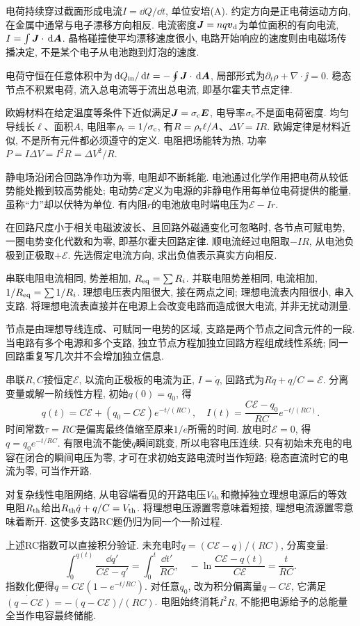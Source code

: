 \label{ch:dc}
电荷持续穿过截面形成电流$I=\dd Q/\dd t$, 单位安培(A). 约定方向是正电荷运动方向, 在金属中通常与电子漂移方向相反. 电流密度$\boldsymbol{J}=nq\boldsymbol{v}_{\rm d}$为单位面积的有向电流, $I=\int\boldsymbol{J}\cdot\,\mathrm d\boldsymbol{A}$. 晶格碰撞使平均漂移速度很小, 电路开始响应的速度则由电磁场传播决定, 不是某个电子从电池跑到灯泡的速度.

电荷守恒在任意体积中为$\,\mathrm d Q_{\rm in}/\,\mathrm d t=-\oint\boldsymbol{J}\cdot\,\mathrm d\boldsymbol{A}$, 局部形式为$\partial_t\rho+\nabla\cdot\jj=0$. 稳态节点不积累电荷, 流入总电流等于流出总电流, 即基尔霍夫节点定律.

欧姆材料在给定温度等条件下近似满足$\boldsymbol{J}=\sigma_{\rm c}\boldsymbol{E}$, 电导率$\sigma_{\rm c}$不是面电荷密度. 均匀导线长$\ell$、面积$A$, 电阻率$\rho_{\rm r}=1/\sigma_{\rm c}$, 有$R=\rho_{\rm r}\ell/A$、$\Delta V=IR$. 欧姆定律是材料近似, 不是所有元件都必须遵守的定义. 电阻把场能转为热, 功率$P=I\Delta V=I^2R=\Delta V^2/R$.

静电场沿闭合回路净作功为零, 电阻却不断耗能. 电池通过化学作用把电荷从较低势能处搬到较高势能处; 电动势$\mathcal E$定义为电源的非静电作用每单位电荷提供的能量, 虽称“力”却以伏特为单位. 有内阻$r$的电池放电时端电压为$\mathcal E-Ir$.

在回路尺度小于相关电磁波波长、且回路外磁通变化可忽略时, 各节点可赋电势, 一圈电势变化代数和为零, 即基尔霍夫回路定律. 顺电流经过电阻取$-IR$, 从电池负极到正极取$+\mathcal E$. 先选假定电流方向, 求出负值表示真实方向相反.

串联电阻电流相同, 势差相加, $R_{\rm eq}=\sum R_i$. 并联电阻势差相同, 电流相加, $1/R_{\rm eq}=\sum1/R_i$. 理想电压表内阻很大, 接在两点之间; 理想电流表内阻很小, 串入支路. 将理想电流表直接并在电源上会改变电路而造成很大电流, 并非无扰动测量.

节点是由理想导线连成、可赋同一电势的区域, 支路是两个节点之间含元件的一段. 当电路有多个电源和多个支路, 独立节点方程加独立回路方程组成线性系统; 同一回路重复写几次并不会增加独立信息.

串联$R,C$接恒定$\mathcal E$, 以流向正极板的电流为正, $I=\dot q$, 回路式为$R\dot q+q/C=\mathcal E$. 分离变量或解一阶线性方程, 初始$q(0)=q_0$, 得
\[
q(t)=C\mathcal E+(q_0-C\mathcal E)e^{-t/(RC)},\quad I(t)=\frac{C\mathcal E-q_0}{RC}e^{-t/(RC)}.
\]
时间常数$\tau=RC$是偏离最终值缩至原来$1/e$所需的时间. 放电时$\mathcal E=0$, 得$q=q_0e^{-t/RC}$. 有限电流不能使$q$瞬间跳变, 所以电容电压连续. 只有初始未充电的电容在闭合的瞬间电压为零, 才可在求初始支路电流时当作短路; 稳态直流时它的电流为零, 可当作开路.

对复杂线性电阻网络, 从电容端看见的开路电压$V_{\rm th}$和撤掉独立理想电源后的等效电阻$R_{\rm th}$给出$R_{\rm th}\dot q+q/C=V_{\rm th}$. 将理想电压源置零意味着短接, 理想电流源置零意味着断开. 这使多支路RC题仍归为同一个一阶过程.


上述RC指数可以直接积分验证. 未充电时$\dot q=(C\mathcal E-q)/(RC)$, 分离变量:
\[
\int_0^{q(t)}\frac{\dd q'}{C\mathcal E-q'}=\int_0^t\frac{\dd t'}{RC},\quad
-\ln\frac{C\mathcal E-q(t)}{C\mathcal E}=\frac t{RC}.
\]
指数化便得$q=C\mathcal E(1-e^{-t/RC})$. 对任意$q_0$, 改为积分偏离量$q-C\mathcal E$, 它满足$\dot{(q-C\mathcal E)}=-(q-C\mathcal E)/(RC)$. 电阻始终消耗$I^2R$, 不能把电源给予的总能量全当作电容最终储能.
